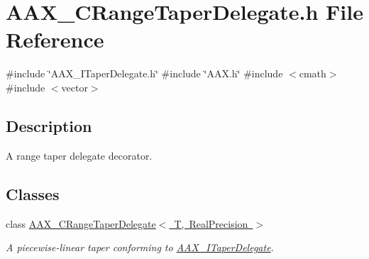 \hypertarget{a00467}{}\section{A\+A\+X\+\_\+\+C\+Range\+Taper\+Delegate.\+h File Reference}
\label{a00467}
{\ttfamily \#include \char`\"{}A\+A\+X\+\_\+\+I\+Taper\+Delegate.\+h\char`\"{}}\newline
{\ttfamily \#include \char`\"{}A\+A\+X.\+h\char`\"{}}\newline
{\ttfamily \#include $<$cmath$>$}\newline
{\ttfamily \#include $<$vector$>$}\newline


\subsection{Description}
A range taper delegate decorator. 

\subsection*{Classes}
\begin{DoxyCompactItemize}
\item 
class \mbox{\hyperlink{a01557}{A\+A\+X\+\_\+\+C\+Range\+Taper\+Delegate$<$ T, Real\+Precision $>$}}
\begin{DoxyCompactList}\small\item\em A piecewise-\/linear taper conforming to \mbox{\hyperlink{a01881}{A\+A\+X\+\_\+\+I\+Taper\+Delegate}}. \end{DoxyCompactList}\end{DoxyCompactItemize}
